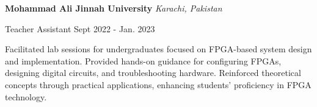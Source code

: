 
\begin{rSection}{}{\bodyfont\bfseries\color{black} \hspace{-1.6em} {Mohammad Ali Jinnah University}} \hfill{\bodyfont\slshape\color{awesome} {Karachi, Pakistan} \vspace{-0.5em}}
\end{rSection}

\begin{cventries}

  \cventry
    {Teacher Assistant} %
    {} %
    {} %
    {Sept 2022 - Jan. 2023} %
    {
      \begin{cvitems} %
        \item[] {Facilitated lab sessions for undergraduates focused on FPGA-based system design and implementation. Provided hands-on
        guidance for configuring FPGAs, designing digital circuits, and troubleshooting hardware. Reinforced theoretical concepts
        through practical applications, enhancing students’ proficiency in FPGA technology.}
      \end{cvitems}
    }



\end{cventries}
